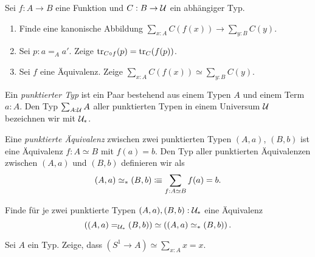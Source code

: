 \documentclass{uebung}
\begin{document}

\begin{exercise}
  Sei $f:A \to B$ eine Funktion und $C : B \to \mathcal{U}$ ein abhängiger Typ.
  \begin{enumerate}
    \item Finde eine kanonische Abbildung $\sum_{x:A} C(f(x)) \to \sum_{y:B} C(y)$.
    \item Sei $p:a=_A a'$. 
      Zeige $\mathrm{tr}_{C\circ f}(p) = \mathrm{tr}_C (f(p))$.
    \item Sei $f$ eine Äquivalenz.
      Zeige $\sum_{x:A} C(f(x)) \simeq \sum_{y:B} C(y)$.
  \end{enumerate}
\end{exercise}

\begin{exercise}
  Ein \emph{punktierter Typ} ist ein Paar bestehend aus einem Typen $A$ und einem Term $a:A$.
  Den Typ $\sum_{A:\mathcal{U}}A$ aller punktierten Typen in einem Universum $\mathcal{U}$ bezeichnen wir mit $\mathcal{U}_*$.

  Eine \emph{punktierte Äquivalenz} zwischen zwei punktierten Typen $(A,a)$, $(B,b)$ ist eine Äquivalenz $f:A\simeq B$ mit $f(a)=b$.
  Den Typ aller punktierten Äquivalenzen zwischen $(A,a)$ und $(B,b)$ definieren wir als
  $$
  (A,a) \simeq_* (B,b) \vcentcolon\mspace{-1.2mu}\equiv \sum_{f:A\simeq B} f(a) = b.
  $$

  Finde für je zwei punktierte Typen $(A,a), (B,b) : \mathcal{U}_*$ eine Äquivalenz
  $$
  \left((A,a) =_{\mathcal{U}_*} (B,b)\right) \simeq \left((A,a) \simeq_* (B,b)\right).
  $$
\end{exercise}

\begin{exercise}
  Sei $A$ ein Typ.
  Zeige, dass $(S^1\to A) \simeq \sum_{x:A} x=x$.
\end{exercise}
\end{document}
